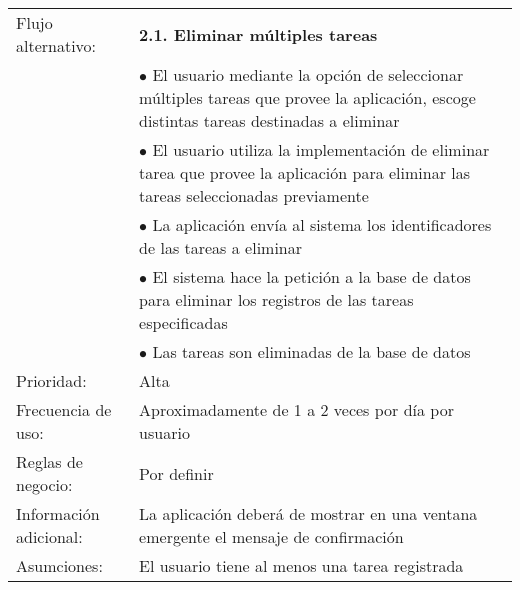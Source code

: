 \begin{longtable}[c]{p{3cm}p{5cm}p{4cm}p{2cm}}
  \hline
  Flujo alternativo: & \multicolumn{3}{p{11cm}}{\textbf{2.1. Eliminar m\'ultiples tareas}}\\
	       & \multicolumn{3}{p{11cm}}{$\bullet$ El usuario mediante la opci\'on de seleccionar m\'ultiples tareas que provee la aplicaci\'on, escoge distintas tareas destinadas a eliminar}\\
	       & \multicolumn{3}{p{11cm}}{$\bullet$ El usuario utiliza la implementaci\'on de eliminar tarea que provee la aplicaci\'on para eliminar las tareas seleccionadas previamente}\\
	       & \multicolumn{3}{p{11cm}}{$\bullet$ La aplicaci\'on env\'ia al sistema los identificadores de las tareas a eliminar}\\
	       & \multicolumn{3}{p{11cm}}{$\bullet$ El sistema hace la petici\'on a la base de datos para eliminar los registros de las tareas especificadas}\\
	       & \multicolumn{3}{p{11cm}}{$\bullet$ Las tareas son eliminadas de la base de datos}\\
  \hline
  Prioridad: & \multicolumn{3}{p{11cm}}{Alta}\\
  \hline
  Frecuencia de uso: & \multicolumn{3}{p{11cm}}{Aproximadamente de 1 a 2 veces por d\'ia por usuario}\\
  \hline
  Reglas de negocio: & \multicolumn{3}{p{11cm}}{Por definir}\\
  \hline
  Informaci\'on adicional: & \multicolumn{3}{p{11cm}}{La aplicaci\'on deber\'a de mostrar en una ventana emergente el mensaje de confirmaci\'on}\\
  \hline
  Asumciones: & \multicolumn{3}{p{11cm}}{El usuario tiene al menos una tarea registrada}\\
  \hline
\end{longtable}

